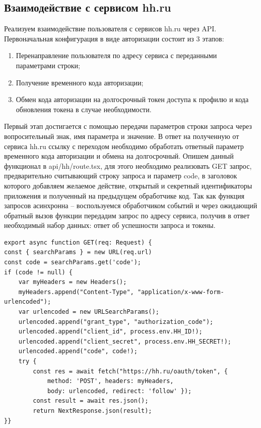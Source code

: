 \documentclass[master, och, pract]{SCWorks}
\begin{document}
\subsection{Взаимодействие с сервисом hh.ru}
Реализуем взаимодействие пользователя с сервисов hh.ru через API. Первоначальная конфигурация в виде авторизации состоит из 3 этапов:
\begin{enumerate}
    \item Перенаправление пользователя по адресу сервиса с переданными параметрами строки;
    \item Получение временного кода авторизации;
    \item Обмен кода авторизации на долгосрочный токен доступа к профилю и кода обновления токена в случае необходимости.\cite{hh_api}
\end{enumerate}

Первый этап достигается с помощью передачи параметров строки запроса через вопросительный знак, имя параметра и значение. В ответ на полученную от сервиса hh.ru ссылку с переходом необходимо обработать ответный параметр временного кода авторизации и обмена на долгосрочный. Опишем данный функционал в api/hh/route.tsx, для этого необходимо реализовать GET запрос, предварительно считывающий строку запроса и параметр code, в заголовок которого добавляем желаемое действие, открытый и секретный идентификаторы приложения и полученный на предыдущем обработчике код. Так как функция запросов асинхронна – воспользуемся обработчиком событий и через ожидающий обратный вызов функции передадим запрос по адресу сервиса, получив в ответ необходимый набор данных: ответ об успешности запроса и токены\cite{Razin_2020}.
\begin{verbatim}
export async function GET(req: Request) {
const { searchParams } = new URL(req.url)
const code = searchParams.get('code');
if (code != null) {
    var myHeaders = new Headers();
    myHeaders.append("Content-Type", "application/x-www-form-urlencoded");
    var urlencoded = new URLSearchParams();
    urlencoded.append("grant_type", "authorization_code");
    urlencoded.append("client_id", process.env.HH_ID!);
    urlencoded.append("client_secret", process.env.HH_SECRET!);
    urlencoded.append("code", code!);
    try {
        const res = await fetch("https://hh.ru/oauth/token", {
            method: 'POST', headers: myHeaders,
            body: urlencoded, redirect: 'follow' });   
        const result = await res.json();
        return NextResponse.json(result);
}} 
\end{verbatim}
\end{document}
